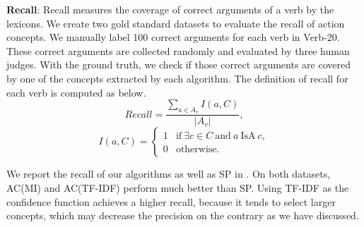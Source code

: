 \textbf{Recall}: Recall measures the coverage of
correct arguments of a verb by the lexicons.
We create two gold standard datasets to evaluate
the recall of action concepts.
We manually label 100 correct arguments for each
verb in Verb-20.
These correct arguments are collected randomly and evaluated
by three human judges. With the ground truth, we check
if those correct arguments are covered by one of the concepts
extracted by each algorithm.
The definition of recall for each verb
is computed as below.
$$
Recall=\frac{\sum_{a \in A_v}{I(a,C)}}{|A_v|},
$$
$$
I(a,C)=
\begin{cases}
1 & \mbox{if}~ \exists c \in C\ \mbox{and}\ a\ \mbox{IsA}\ c,\\
0 & \mbox{otherwise.}
\end{cases}
$$

We report the recall of our algorithms %
as well as SP in .
On both datasets, AC(MI) and AC(TF-IDF) perform much better than SP.
Using TF-IDF as the confidence function achieves a higher recall, because it
tends to select larger concepts, which may decrease the precision
on the contrary as we have discussed.

